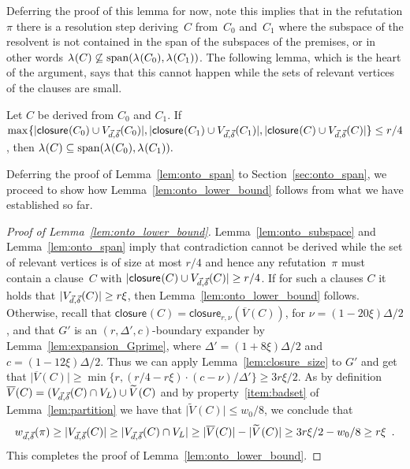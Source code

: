 \documentclass{article}
\newcommand{\maxofexpr}[2][]{\max_{#1} \{ #2 \}}
\newcommand{\set}[1]{\{ #1 \}}
\newcommand{\setsize}[1]{\lvert#1\rvert}
\newcommand{\eqperiod}{\enspace .}
\newcommand{\reflem}[1]{Lemma~\ref{#1}}
\newcommand{\refpi}{\pi}
\newcommand{\genericformsmall}[2]{\mathit{#1}( #2 )}
\newcommand{\width}[2][]{\genericformsmall{W_{#1}}{#2}}
\newcommand{\diff}{\xi}
\newcommand{\GdegMax}{\Delta}
\newcommand{\gdegmax}{\GdegMax}
\newcommand{\V}[1][]{V_{#1}}
\newcommand{\Vl}{\V[L]}
\newcommand{\Gprime}{G'}
\newcommand{\GprimeConstantDeg}{8}
\newcommand{\GprimeConstantExp}{12}
\newcommand{\Vbad}[2][]{\widetilde V^{#1}(#2)}
\newcommand{\VbadThick}[1]{\overline V(#1)}
\newcommand{\vecthr}{\vec{d}}
\newcommand{\vecadv}{\vec{\delta}}
\newcommand{\linmap}[1][]{\ensuremath \lambda_{{#1}}}
\newcommand{\linmapof}[2][]{\linmap[#1](#2)}
\newcommand{\Vthick}[1]{\ensuremath V_{\vecthr,\vecadv}(#1)}
\renewcommand{\width}[1]{\ensuremath w_{\vecthr,\vecadv}( #1 )}
\newcommand{\closure}[2][]{\mathsf{closure}_{{#1}}(#2)}
\newcommand{\spans}[1]{\mathrm{span} ( #1 )}
\numberwithin{equation}{section}
\begin{document}
  Deferring the proof of this lemma for now, note 
  this implies that in the refutation
  $\refpi$ there is a resolution step deriving~$C$ from~$C_0$
  and~$C_1$ where the subspace of the resolvent is not contained
  in the span of the subspaces of the premises, or in other words
  $\linmapof{C} 
  \not\subseteq \spans{\linmapof{C_0}, \linmapof{C_1}}$.
  The following lemma, which is the heart of the argument, says that this
  cannot happen while the sets
  of relevant vertices of the clauses are small.

  \begin{lemma}\label{lem:onto_span}
    Let $C$ be derived from $C_0$ and $C_1$.
    If $
    \maxofexpr{
    \setsize{ \closure{C_0} \cup \Vthick{C_0} }, 
    \setsize{ \closure{C_1} \cup \Vthick{C_1} }, 
    \setsize{ \closure{C} \cup \Vthick{C} }
    } 
    \le r/4
    $,
    then
    $\linmapof{C} \subseteq \spans{\linmapof{C_0}, \linmapof{C_1}}.$
  \end{lemma}

  Deferring the proof of Lemma~\ref{lem:onto_span} to Section~\ref{sec:onto_span}, 
  we proceed to show how \reflem{lem:onto_lower_bound} follows from 
  what we have established so far.



  \begin{proof}[Proof of \reflem{lem:onto_lower_bound}]
  \reflem{lem:onto_subspace} and \reflem{lem:onto_span} imply that
  contradiction cannot be derived while the set of relevant
  vertices is of size at most $r/4$ and hence
  any refutation~$\refpi$ must contain a clause~$C$
  with
  $\setsize{\closure{C} \cup \Vthick{C}} \geq r/4$.
  If for such a clauses $C$ it holds that
  $\setsize{\Vthick{C}} \ge r\diff$, then \reflem{lem:onto_lower_bound} follows.
  Otherwise,
  recall that 
  $\closure{C} = \closure[r,\nu]{\VbadThick{C}}$, 
  for $\nu =  (1 - 20\diff)\gdegmax/2$, and that
  $\Gprime$ is an
  $(r, \gdegmax', c)$-boundary 
  expander by Lemma~\ref{lem:expansion_Gprime}, 
  where $\gdegmax' = (1 + \GprimeConstantDeg \diff) \GdegMax/2$
  and $c = (1 - \GprimeConstantExp  \diff)\GdegMax/2$. Thus we can 
  apply
  Lemma~\ref{lem:closure_size} to $G'$ and get that
  $\setsize{\VbadThick{C}}
  \ge \min\set{r, (r/4 - r \diff)\cdot \left( c - \nu \right) / \gdegmax'} 
  \ge 3r\diff / 2 $.
As by definition $\VbadThick{C} = (\Vthick{C} \cap \Vl) \cup \Vbad{C}$
  and by property~\ref{item:badset} of Lemma~\ref{lem:partition} we have that
  $\setsize{ \Vbad{C} } \leq w_0/8$, we conclude that
  \begin{equation}
    \width{\refpi} \ge \setsize{\Vthick{C}} 
    \ge \setsize{\Vthick{C} \cap \Vl} 
    \ge \setsize{ \VbadThick{C} } - \setsize{ \Vbad{C} }
    \ge 3r\diff/2  - w_0/8 
    \ge r\diff \eqperiod
  \end{equation}
  This completes the proof of \reflem{lem:onto_lower_bound}.
  \end{proof}
\end{document}
